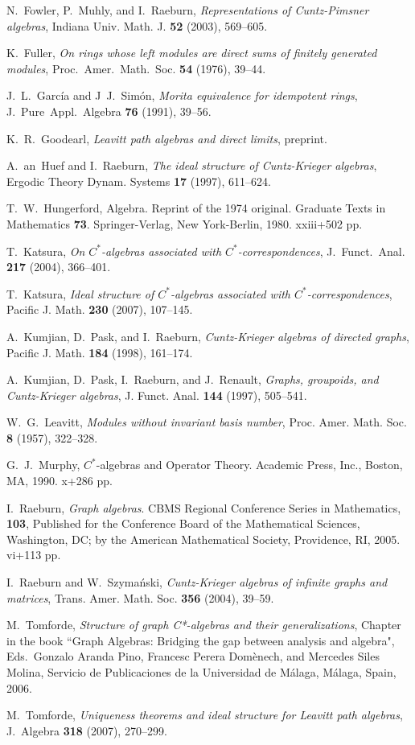 \documentclass[11pt]{amsart}
\theoremstyle{remark}
\numberwithin{equation}{section}
\begin{document}
\begin{thebibliography}{99}
N.~Fowler, P.~Muhly, and I.~Raeburn, \emph{Representations
of Cuntz-Pimsner algebras}, Indiana Univ. Math. J. \textbf{52}
(2003), 569--605.

K.~Fuller, \emph{On rings whose left modules are direct sums of finitely generated modules},  Proc.~Amer.~Math.~Soc. \textbf{54}  (1976), 39--44. 

J.~L.~Garc\'ia and J~J.~Sim\'on, \emph{Morita equivalence for idempotent rings}, J.~Pure~Appl.~Algebra \textbf{76} (1991), 39--56.

K.~R.~Goodearl, \emph{Leavitt path algebras and direct limits}, preprint. 

A.~an~Huef and I.~Raeburn, \emph{The ideal structure of
Cuntz-Krieger algebras}, Ergodic Theory Dynam. Systems
\textbf{17} (1997), 611--624.

T.~W.~Hungerford, Algebra. Reprint of the 1974 original. Graduate Texts in Mathematics \textbf{73}. Springer-Verlag, New York-Berlin, 1980. xxiii+502 pp.

T.~Katsura,  \emph{On $C^*$-algebras associated with
$C^*$-correspondences},  J.~Funct.~Anal.  \textbf{217}  (2004), 366--401.

T.~Katsura, \emph{Ideal structure of $C^*$-algebras associated
with $C^*$-correspondences}, Pacific J. Math. \textbf{230} (2007), 107--145.

A.~Kumjian, D.~Pask, and I.~Raeburn, \emph{Cuntz-Krieger
algebras of directed graphs}, Pacific J. Math. \textbf{184}
(1998), 161--174.

A.~Kumjian, D.~Pask, I.~Raeburn, and J.~Renault,
\emph{Graphs, groupoids, and Cuntz-Krieger algebras}, J. Funct.
Anal. \textbf{144} (1997), 505--541.

W.~G.~Leavitt, \emph{Modules without invariant basis number}, Proc. Amer. Math. Soc. \textbf{8} (1957), 322--328. 

G.~J.~Murphy, $C^*$-algebras and Operator Theory. Academic Press, Inc., Boston, MA, 1990. x+286 pp.

I.~Raeburn,  \emph{Graph algebras}. CBMS Regional Conference Series in Mathematics, \textbf{103}, Published for the Conference Board of the Mathematical Sciences, Washington, DC; by the American Mathematical Society, Providence, RI, 2005. vi+113 pp.

I.~Raeburn and W.~Szyma\'{n}ski, \emph{Cuntz-Krieger algebras of
infinite graphs and matrices}, Trans. Amer. Math. Soc.
\textbf{356} (2004), 39--59.

M.~Tomforde, \emph{Structure of graph C*-algebras and their generalizations}, Chapter in the book ``Graph  Algebras: Bridging the gap between analysis and algebra", Eds.~Gonzalo Aranda Pino, Francesc Perera Dom\`enech, and Mercedes Siles Molina, Servicio de Publicaciones de la  Universidad de M\'alaga, M\'alaga, Spain, 2006.

M.~Tomforde, \emph{Uniqueness theorems and ideal structure for Leavitt path algebras}, J.~Algebra \textbf{318} (2007), 270--299.

\end{thebibliography}
\end{document}
